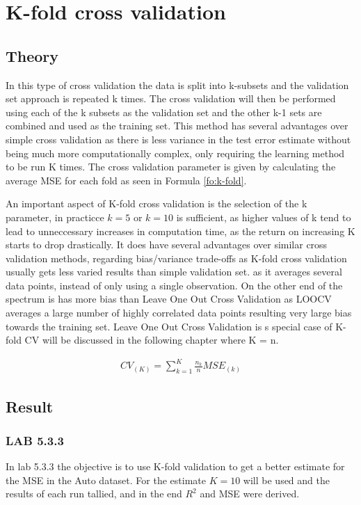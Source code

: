 \section {K-fold cross validation}%
\subsection{Theory}
In this type of cross validation the data is split into k-subsets and the validation set approach is repeated k times. The cross validation will then be performed using each of the k subsets as the validation set and the other k-1 sets are combined and used as the training set. This method has several advantages over simple cross validation as there is less variance in the test error estimate without being much more computationally complex, only requiring the learning method to be run K times. The cross validation parameter is given by calculating the average MSE for each fold as seen in Formula \ref{fo:k-fold}. 

An important aspect of K-fold cross validation is the selection of the k parameter, in practicce $k=5$ or $k=10$ is sufficient, as higher values of k tend to lead to unneccessary increases in computation time, as the return on increasing K starts to drop drastically. It does have several advantages over similar cross validation methods, regarding bias/variance trade-offs as K-fold cross validation usually gets less varied results than simple validation set. as it averages several data points, instead of only using a single observation. On the other end of the spectrum is has more bias than Leave One Out Cross Validation as LOOCV averages a large number of highly correlated data points resulting very large bias towards the training set. Leave One Out Cross Validation is s special case of K-fold CV will be discussed in the following chapter where K = n.

\begin{align}\label{fo:k-fold}
CV_{(K)} = \sum_{k=1}^{K}  \frac {n_{k}}{n}MSE_{(k)}
\end{align}

\subsection{Result}
\subsubsection*{LAB 5.3.3}%
In lab 5.3.3 the objective is to use K-fold validation to get a better estimate for the MSE in the Auto dataset. For the estimate $K=10$ will be used and the results of each run tallied, and in the end $R^2$ and MSE were derived.

